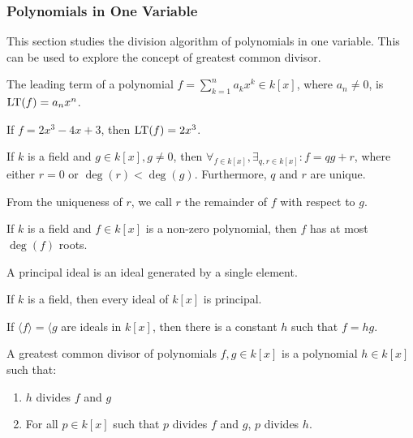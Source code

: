 \documentclass[../main.tex]{subfiles}
\begin{document}
\subsubsection{Polynomials in One Variable}
%
This section studies the division algorithm of polynomials in one variable. This can be used to explore the concept of greatest common divisor. 

\begin{definition}
The leading term of a polynomial $f = \sum_{k=1}^{n} a_kx^k \in k[x]$, where $a_n \ne 0$, is $\operatorname{LT}(f)=a_nx^n$. 
\end{definition}

\begin{example}
If $f = 2x^3-4x+3$, then $\operatorname{LT}(f) = 2x^3$.
\end{example}

\begin{theorem}
If $k$ is a field and $g\in k[x],g\ne 0$, then $\forall_{f\in k[x]}, \exists_{q,r\in k[x]}: f = qg+r$, where either $r=0$ or $\deg(r)<\deg(g)$. Furthermore, $q$ and $r$ are unique.
\end{theorem}

\begin{remark}
From the uniqueness of $r$, we call $r$ the remainder of $f$ with respect to $g$.
\end{remark}

\begin{theorem}
If $k$ is a field and $f\in k[x]$ is a non-zero polynomial, then $f$ has at most $\deg(f)$ roots.
\end{theorem}

\begin{definition}
A principal ideal is an ideal generated by a single element.
\end{definition}

\begin{theorem}
If $k$ is a field, then every ideal of $k[x]$ is principal.
\end{theorem}

\begin{theorem}
If $\langle f \rangle = \langle g$ are ideals in $k[x]$, then there is a constant $h$ such that $f=hg$.
\end{theorem}

\begin{definition}
A greatest common divisor of polynomials $f,g\in k[x]$ is a polynomial $h\in k[x]$ such that:
\begin{enumerate}
\item $h$ divides $f$ and $g$
\item For all $p\in k[x]$ such that $p$ divides $f$ and $g$, $p$ divides $h$.
\end{enumerate}
\end{definition}
\end{document}
